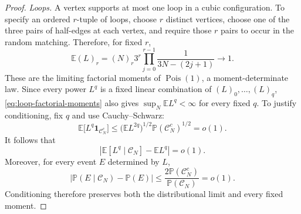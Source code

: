 \documentclass[11pt]{article}
\newcommand{\E}{\mathbb E}
\newcommand{\Pp}{\mathbb P}
\newcommand{\Pois}{\operatorname{Pois}}
\theoremstyle{plain}
\theoremstyle{definition}
\numberwithin{equation}{section}
\begin{document}
\begin{proof}
\smallskip
\noindent\emph{Loops.}
A vertex supports at most one loop in a cubic
configuration.  To specify an ordered $r$-tuple of loops, choose $r$ distinct
vertices, choose one of the three pairs of half-edges at each vertex, and
require those $r$ pairs to occur in the random matching.  Therefore, for
fixed $r$,
\begin{equation}\label{eq:loop-factorial-moments}
  \E (L)_r
  =(N)_r3^r
  \prod_{j=0}^{r-1}\frac{1}{3N-(2j+1)}
  \longrightarrow 1.
\end{equation}
These are the limiting factorial moments of $\Pois(1)$, a moment-determinate
law.  Since every power $L^q$ is a fixed linear combination of
$(L)_0,\ldots,(L)_q$, \eqref{eq:loop-factorial-moments} also gives
$\sup_N\E L^q<\infty$ for every fixed $q$.  To justify conditioning, fix $q$
and use Cauchy--Schwarz:
\[
  \E\bigl[L^q\mathbf 1_{\mathcal C_N^c}\bigr]
  \leq \bigl(\E L^{2q}\bigr)^{1/2}
       \Pp(\mathcal C_N^c)^{1/2}=o(1).
\]
It follows that
\[
 \left|\E[L^q\mid\mathcal C_N]-\E L^q\right|=o(1).
\]
Moreover, for every event $E$ determined by $L$,
\[
 \left|\Pp(E\mid\mathcal C_N)-\Pp(E)\right|
 \leq \frac{2\Pp(\mathcal C_N^c)}{\Pp(\mathcal C_N)}=o(1).
\]
Conditioning therefore preserves both the distributional limit and every
fixed moment.


\end{proof}
\end{document}
